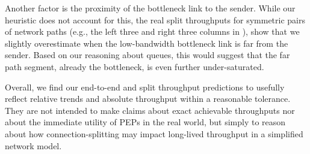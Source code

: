 Another factor is the proximity of the bottleneck link to the sender. While
our heuristic does not account for this, the real split throughputs for
symmetric pairs of network paths (e.g., the left three and right three columns
in ), show that we slightly overestimate
when the low-bandwidth bottleneck link is far from the sender.
Based on our reasoning about queues, this would suggest that the far path
segment, already the bottleneck, is even further under-saturated.

Overall, we find our end-to-end and split throughput predictions to usefully
reflect relative trends and absolute throughput within a
reasonable tolerance. They are not intended to make claims about exact achievable
throughputs nor about the immediate utility of PEPs in the real world,
but simply to reason about how connection-splitting may impact
long-lived throughput in a simplified network model.






